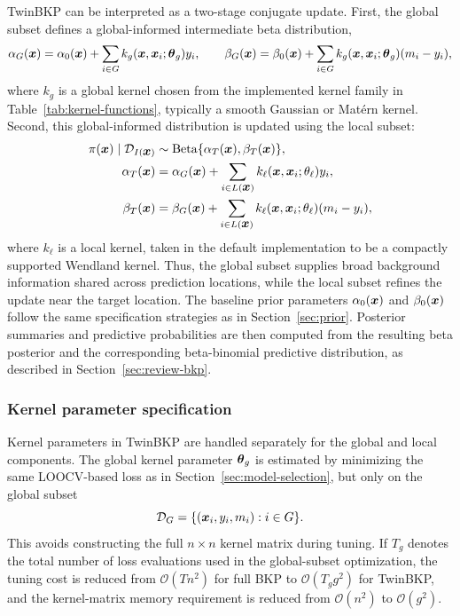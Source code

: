 \documentclass[article, shortnames]{jss}
\renewcommand{\vec}[1]{\mbox{\boldmath ${#1}$}}
\begin{document}
TwinBKP can be interpreted as a two-stage conjugate update. 
First, the global subset defines a global-informed intermediate beta distribution,
\[
\alpha_G(\vec{x}) 
= \alpha_0(\vec{x}) + \sum_{i\in G} k_g(\vec{x},\vec{x}_i;\vec{\theta}_g)y_i,
\qquad
\beta_G(\vec{x}) 
= \beta_0(\vec{x}) + \sum_{i\in G} k_g(\vec{x},\vec{x}_i;\vec{\theta}_g)(m_i-y_i),
\]
where $k_g$ is a global kernel chosen from the implemented kernel family in Table~\ref{tab:kernel-functions}, typically a smooth Gaussian or Mat{\'e}rn kernel. 
Second, this global-informed distribution is updated using the local subset:
\begin{align}
	\pi(\vec{x})\mid \mathcal{D}_{I(\vec{x})} 
	&\sim \mathrm{Beta}\{\alpha_T(\vec{x}),\beta_T(\vec{x})\}, \notag\\
	\alpha_T(\vec{x}) 
	&= \alpha_G(\vec{x}) 
	+ \sum_{i\in L(\vec{x})} k_\ell(\vec{x},\vec{x}_i;\theta_\ell)y_i, \label{eq:twin-bkp}\\
	\beta_T(\vec{x}) 
	&= \beta_G(\vec{x}) 
	+ \sum_{i\in L(\vec{x})} k_\ell(\vec{x},\vec{x}_i;\theta_\ell)(m_i-y_i), \notag
\end{align}
where $k_\ell$ is a local kernel, taken in the default implementation to be a compactly supported Wendland kernel. 
Thus, the global subset supplies broad background information shared across prediction locations, while the local subset refines the update near the target location. 
The baseline prior parameters $\alpha_0(\vec{x})$ and $\beta_0(\vec{x})$ follow the same specification strategies as in Section~\ref{sec:prior}. 
Posterior summaries and predictive probabilities are then computed from the resulting beta posterior and the corresponding beta-binomial predictive distribution, as described in Section~\ref{sec:review-bkp}.

\subsubsection{Kernel parameter specification}

Kernel parameters in TwinBKP are handled separately for the global and local components. 
The global kernel parameter $\vec{\theta}_g$ is estimated by minimizing the same LOOCV-based loss as in Section~\ref{sec:model-selection}, but only on the global subset
\[
\mathcal{D}_G=\{(\vec{x}_i,y_i,m_i):i\in G\}.
\]
This avoids constructing the full $n\times n$ kernel matrix during tuning. 
If $T_g$ denotes the total number of loss evaluations used in the global-subset optimization, the tuning cost is reduced from $\mathcal{O}(T n^2)$ for full BKP to $\mathcal{O}(T_g g^2)$ for TwinBKP, and the kernel-matrix memory requirement is reduced from $\mathcal{O}(n^2)$ to $\mathcal{O}(g^2)$. 
\end{document}
